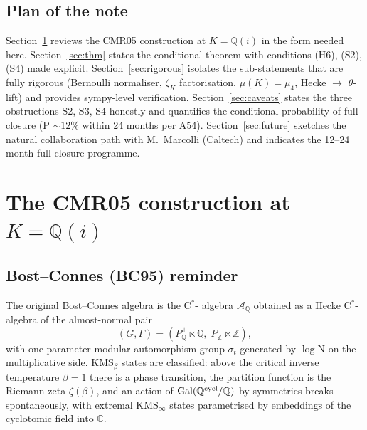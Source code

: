 \documentclass[12pt]{amsart}
\theoremstyle{definition}
\newcommand{\Z}{\mathbb{Z}}
\newcommand{\Q}{\mathbb{Q}}
\newcommand{\C}{\mathbb{C}}
\newcommand{\Gal}{\mathrm{Gal}}
\newcommand{\Norm}{\mathrm{N}}
\begin{document}
\subsection{Plan of the note}
Section~\ref{sec:cmr} reviews the CMR05 construction at $K = \Q(i)$
in the form needed here. Section~\ref{sec:thm} states the
conditional theorem with conditions (H6), (S2), (S4) made explicit.
Section~\ref{sec:rigorous} isolates the sub-statements that are
fully rigorous (Bernoulli normaliser, $\zeta_K$ factorisation,
$\mu(K) = \mu_4$, Hecke $\to$ $\theta$-lift) and provides
sympy-level verification. Section~\ref{sec:caveats} states the
three obstructions S2, S3, S4 honestly and quantifies the
conditional probability of full closure (P $\sim 12\%$ within 24
months per A54). Section~\ref{sec:future} sketches the natural
collaboration path with M.~Marcolli (Caltech) and indicates the
12--24 month full-closure programme.

\section{The CMR05 construction at $K = \Q(i)$}
\label{sec:cmr}

\subsection{Bost--Connes (BC95) reminder}
The original Bost--Connes algebra \cite{BC95} is the C${}^*$-
algebra $\mathcal{A}_\Q$ obtained as a Hecke C${}^*$-algebra of the
almost-normal pair
\[
  (G,\Gamma) = (P_\Q^+ \ltimes \Q,\; P_\Z^+ \ltimes \Z),
\]
with one-parameter modular automorphism group $\sigma_t$ generated
by $\log \Norm$ on the multiplicative side. KMS$_\beta$ states are
classified: above the critical inverse temperature $\beta = 1$
there is a phase transition, the partition function is the Riemann
zeta $\zeta(\beta)$, and an action of $\Gal(\Q^{\rm cycl}/\Q)$ by
symmetries breaks spontaneously, with extremal KMS$_\infty$ states
parametrised by embeddings of the cyclotomic field into $\C$.
\end{document}
